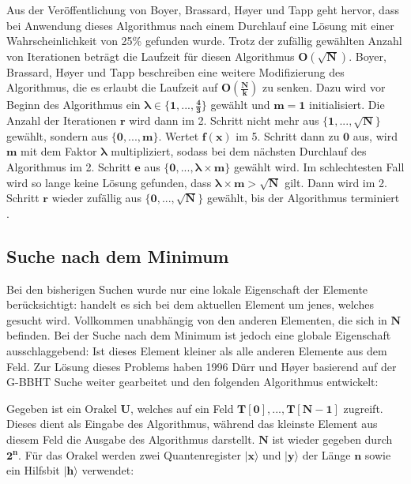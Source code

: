 Aus der Veröffentlichung von Boyer, Brassard, Høyer und Tapp geht hervor, dass bei Anwendung dieses Algorithmus nach einem Durchlauf eine Lösung mit einer Wahrscheinlichkeit von 25\% gefunden wurde. 
Trotz der zufällig gewählten Anzahl von Iterationen beträgt die Laufzeit für diesen Algorithmus $\mathbf{O(\sqrt{N})}$.
Boyer, Brassard, Høyer und Tapp beschreiben eine weitere Modifizierung des Algorithmus, die es erlaubt die Laufzeit auf $\mathbf{O(\frac{N}{k})}$ zu senken. 
Dazu wird vor Beginn des Algorithmus ein $\mathbf{\pmb\lambda \in \{1, ..., \frac{4}{3} \} }$ gewählt und $\mathbf{m = 1}$ initialisiert. Die Anzahl der Iterationen $\mathbf{r}$ wird dann im 2. Schritt nicht mehr aus $\mathbf{\{1, ..., \sqrt{N}\}}$ gewählt, sondern aus $\mathbf{\{0, ..., m\}}$. 
Wertet $\mathbf{f(x)}$ im 5. Schritt dann zu $\mathbf{0}$ aus, wird $\mathbf{m}$ mit dem Faktor $\mathbf{\pmb\lambda}$ multipliziert, sodass bei dem nächsten Durchlauf des Algorithmus im 2. Schritt $\mathbf{e}$ aus $\mathbf{\{0, ..., \pmb\lambda \times m\}}$  gewählt wird. 
Im schlechtesten Fall wird so lange keine Lösung gefunden, dass $\mathbf{\pmb\lambda \times m > \sqrt{N}}$ gilt. Dann wird im 2. Schritt $\mathbf{r}$ wieder zufällig aus $\mathbf{\{0, ..., \sqrt{N}\}}$ gewählt, bis der Algorithmus terminiert \cite[S. 141]{Ho99}.


\subsection{Suche nach dem Minimum}
Bei den bisherigen Suchen wurde nur eine lokale Eigenschaft der Elemente berücksichtigt: handelt es sich bei dem aktuellen Element um jenes, welches gesucht wird. 
Vollkommen unabhängig von den anderen Elementen, die sich in $\mathbf{N}$ befinden. Bei der Suche nach dem Minimum ist jedoch eine globale Eigenschaft ausschlaggebend: Ist dieses Element kleiner als alle anderen Elemente aus dem Feld.
Zur Lösung dieses Problems haben 1996 Dürr und Høyer basierend auf der G-BBHT Suche weiter gearbeitet und den folgenden Algorithmus entwickelt: 

Gegeben ist ein Orakel $\mathbf{U}$, welches auf ein Feld $\mathbf{T[0], ..., T[N-1]}$ zugreift. 
Dieses dient als Eingabe des Algorithmus, während das kleinste Element aus diesem Feld die Ausgabe des Algorithmus darstellt. $\mathbf{N}$ ist wieder gegeben durch $\mathbf{2^n}$. 
Für das Orakel werden zwei Quantenregister $\mathbf{|x\rangle}$ und $\mathbf{|y\rangle}$ der Länge $\mathbf{n}$ sowie ein Hilfsbit $\mathbf{|h\rangle}$ verwendet:

